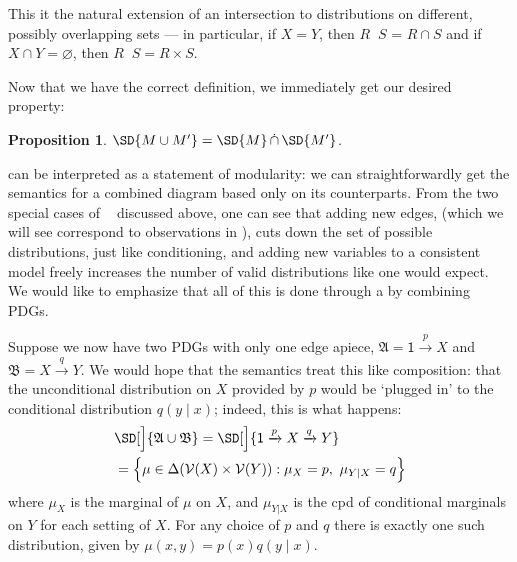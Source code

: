 \documentclass{article}
\theoremstyle{plain}
\newtheorem{prop}[theorem]{Proposition}
\theoremstyle{definition}
\newenvironment{example}
	{\pushQED{\qed}\renewcommand{\qedsymbol}{$\triangle$}\examplex}
	{\popQED\endexamplex%
}
\theoremstyle{remark}
\newcommand{\notation}[2][]{#1}
\renewcommand{\notation}[2][]{{\color{notationcolor} #2}}
\DeclareMathOperator\dcap{\mathop{\dot\cap}}
\newcommand{\V}{\mathcal V}
\newcommand{\dg}[1]{\mathfrak{#1}}
\newcommand{\var}[1]{\mathsf{#1}}
\newcommand{\MN}{PDG}
\newcommand{\MNs}{\MN s}
\numberwithin{equation}{section}
\begin{document}
\begin{vfull}
\begin{defn}[$\dcap$]
		This it the natural extension of an intersection to distributions on different, possibly overlapping sets --- in particular, if $X = Y$, then $R \dcap S$ = $R \cap S$ and if \notation[$X$ and $Y$ are disjoint]{$X \cap Y = \varnothing$}, then $R \dcap S = R \times S$. 
	\end{defn}
	
	
	Now that we have the correct definition, we immediately get our desired property:
	
	\begin{prop}\label{prop:union-set-semantics}
		$\SD{M \cup M'} = \SD{M} \dcap \SD{M'}$.
	\end{prop}

	 can be interpreted as a statement of modularity: we can straightforwardly get the semantics for a combined diagram based only on its counterparts. 
	From the two special cases of $\dcap$ discussed above, one can see that adding new edges, (which we will see correspond to observations in ), cuts down the set of possible distributions, just like conditioning, and adding new variables to a consistent model freely increases the number of valid distributions like one would expect. We would like to emphasize that all of this is done through a by combining \MNs.
	
	\begin{example}\label{ex:sd-compose-unconditional}
		Suppose we now have two PDGs with only one edge apiece, $\dg A = {\var 1} \xrightarrow{p} X$ and $\dg B = X \xrightarrow{q} Y$. We would hope that the semantics treat this like composition: that the unconditional distribution on $X$ provided by $p$ would be `plugged in' to the conditional distribution $q(y \mid x)$; indeed, this is what happens:
		\begin{align*}
			&\SD[\Big]{{\dg A \cup \dg B}} = \SD[\Big]{{\var 1} \xrightarrow{p} X \xrightarrow{q} Y} \\
				&= \Big\{  \mu \in \Delta(\V(X) \times \V(Y)) : \mu_X = p,~\mu_{Y|X} = q \Big\} 
		\end{align*}
		where $\mu_X$ is the marginal of $\mu$ on $X$, and $\mu_{Y|X}$ is the cpd of conditional marginals on $Y$ for each setting of $X$.
		For any choice of $p$ and $q$ there is exactly one such distribution, given by $\mu(x,y) = p(x) q(y \mid x)$.
	\end{example}



\end{vfull}
\end{document}
